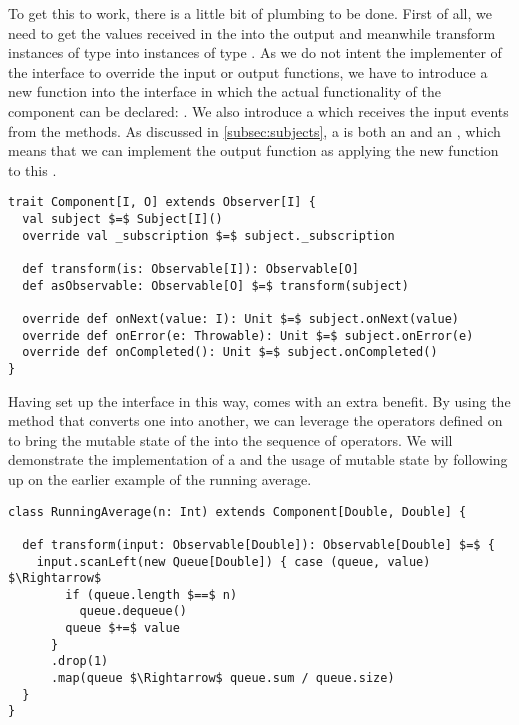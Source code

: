 To get this to work, there is a little bit of plumbing to be done. First of all, we need to get the values received in the \obv into the output \obs and meanwhile transform instances of type  into instances of type . As we do not intent the implementer of the \comp interface to override the input or output functions, we have to introduce a new function into the interface in which the actual functionality of the component can be declared: . We also introduce a \subj which receives the input events from the \obv methods. As discussed in \cref{subsec:subjects}, a \subj is both an \obv and an \obs, which means that we can implement the output function as applying the new  function to this \subj.

\begin{lstlisting}[style=ScalaStyle, caption={\comp interface}, label={lst:component-v1}]
trait Component[I, O] extends Observer[I] {
  val subject $=$ Subject[I]()
  override val _subscription $=$ subject._subscription
  
  def transform(is: Observable[I]): Observable[O]
  def asObservable: Observable[O] $=$ transform(subject)
  
  override def onNext(value: I): Unit $=$ subject.onNext(value)
  override def onError(e: Throwable): Unit $=$ subject.onError(e)
  override def onCompleted(): Unit $=$ subject.onCompleted()
}
\end{lstlisting}

Having set up the \comp interface in this way, comes with an extra benefit. By using the  method that converts one \obs into another, we can leverage the operators defined on \obs to bring the mutable state of the \comp into the sequence of operators. We will demonstrate the implementation of a \comp and the usage of mutable state by following up on the earlier example of the running average.

\begin{lstlisting}[style=ScalaStyle, caption={Implementation of \code{RunningAverage} using the \comp interface}, label={lst:running-average-final}]
class RunningAverage(n: Int) extends Component[Double, Double] {

  def transform(input: Observable[Double]): Observable[Double] $=$ {
    input.scanLeft(new Queue[Double]) { case (queue, value) $\Rightarrow$ 
        if (queue.length $==$ n)
          queue.dequeue()
        queue $+=$ value
      }
      .drop(1)
      .map(queue $\Rightarrow$ queue.sum / queue.size)
  }
}
\end{lstlisting}

